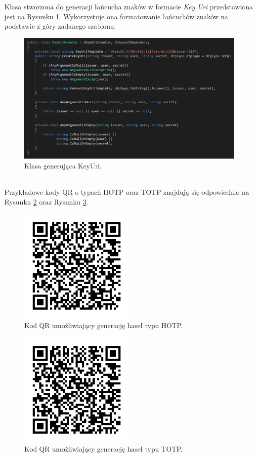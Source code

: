 Klasa stworzona do generacji łańcucha znaków w formacie \textit{Key Uri} przedstawiona jest na Rysunku \ref{code-keyuri}.
Wykorzystuje ona formatowanie łańcuchów znaków na podstawie z góry zadanego szablonu.
\begin{figure}[t]
    \centering
	\includegraphics[width=\textwidth]{content/images/code-keyuri}
    \caption{Klasa generująca KeyUri.}
    \label{code-keyuri}
\end{figure} \\
Przykładowe kody QR o typach HOTP oraz TOTP znajdują się odpowiednio na Rysunku \ref{qr-hotp} oraz Rysunku \ref{qr-totp}.
\begin{figure}[t]
    \centering
	\includegraphics[width=0.5\textwidth]{content/images/qr-hotp}
    \caption{Kod QR umożliwiający generację haseł typu HOTP.}
    \label{qr-hotp}
\end{figure}
\begin{figure}[t]
    \centering
	\includegraphics[width=0.5\textwidth]{content/images/qr-totp}
	\caption{Kod QR umożliwiający generację haseł typu TOTP.}
    \label{qr-totp}
\end{figure}
